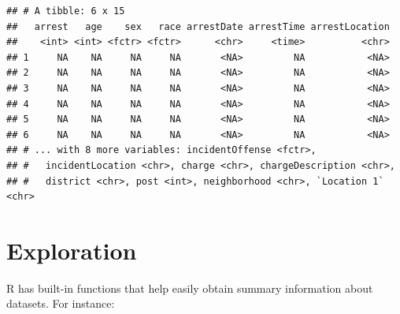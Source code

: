 \documentclass[12pt,]{book}
\newenvironment{Shaded}{\begin{snugshade}}{\end{snugshade}}
\newcommand{\KeywordTok}[1]{\textcolor[rgb]{0.13,0.29,0.53}{\textbf{#1}}}
\newcommand{\DecValTok}[1]{\textcolor[rgb]{0.00,0.00,0.81}{#1}}
\newcommand{\StringTok}[1]{\textcolor[rgb]{0.31,0.60,0.02}{#1}}
\newcommand{\CommentTok}[1]{\textcolor[rgb]{0.56,0.35,0.01}{\textit{#1}}}
\newcommand{\OperatorTok}[1]{\textcolor[rgb]{0.81,0.36,0.00}{\textbf{#1}}}
\newcommand{\NormalTok}[1]{#1}
\theoremstyle{definition}
\theoremstyle{definition}
\theoremstyle{remark}
\begin{document}
\begin{Shaded}
\end{Shaded}

\begin{verbatim}
## # A tibble: 6 x 15
##   arrest   age    sex   race arrestDate arrestTime arrestLocation
##    <int> <int> <fctr> <fctr>      <chr>     <time>          <chr>
## 1     NA    NA     NA     NA       <NA>         NA           <NA>
## 2     NA    NA     NA     NA       <NA>         NA           <NA>
## 3     NA    NA     NA     NA       <NA>         NA           <NA>
## 4     NA    NA     NA     NA       <NA>         NA           <NA>
## 5     NA    NA     NA     NA       <NA>         NA           <NA>
## 6     NA    NA     NA     NA       <NA>         NA           <NA>
## # ... with 8 more variables: incidentOffense <fctr>,
## #   incidentLocation <chr>, charge <chr>, chargeDescription <chr>,
## #   district <chr>, post <int>, neighborhood <chr>, `Location 1` <chr>
\end{verbatim}

\begin{Shaded}
\end{Shaded}

\section{Exploration}\label{exploration}

R has built-in functions that help easily obtain summary information
about datasets. For instance:
\end{document}
